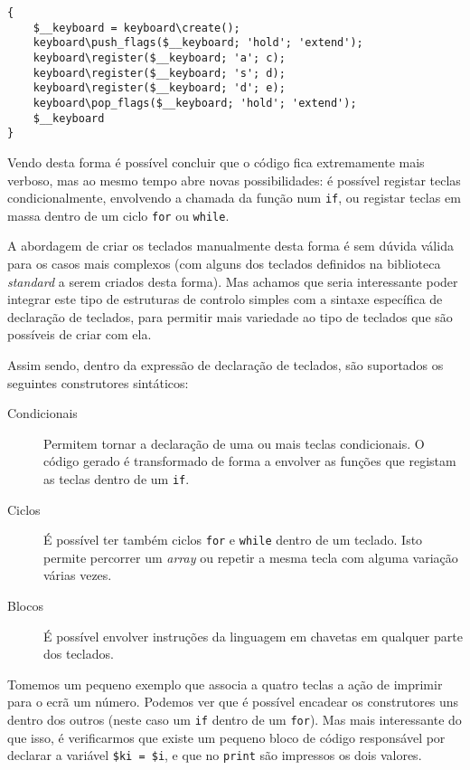 \begin{lstlisting}[caption={Código gerado automaticamente para criação do teclado descrito no capitulo anterior}]
{
    $__keyboard = keyboard\create();
    keyboard\push_flags($__keyboard; 'hold'; 'extend');
    keyboard\register($__keyboard; 'a'; c);
    keyboard\register($__keyboard; 's'; d);
    keyboard\register($__keyboard; 'd'; e);
    keyboard\pop_flags($__keyboard; 'hold'; 'extend');
    $__keyboard
}
\end{lstlisting}

Vendo desta forma é possível concluir que o código fica extremamente mais verboso, mas ao mesmo tempo abre novas possibilidades: é possível registar teclas condicionalmente, envolvendo a chamada da função num \texttt{if}, ou registar teclas em massa dentro de um ciclo \texttt{for} ou \texttt{while}.

A abordagem de criar os teclados manualmente desta forma é sem dúvida válida para os casos mais complexos (com alguns dos teclados definidos na biblioteca \textit{standard} a serem criados desta forma). Mas achamos que seria interessante poder integrar este tipo de estruturas de controlo simples com a sintaxe específica de declaração de teclados, para permitir mais variedade ao tipo de teclados que são possíveis de criar com ela.

Assim sendo, dentro da expressão de declaração de teclados, são suportados os seguintes construtores sintáticos:
\begin{description}
 \item[Condicionais] Permitem tornar a declaração de uma ou mais teclas condicionais. O código gerado é transformado de forma a envolver as funções que registam as teclas dentro de um \texttt{if}.
 \item[Ciclos] É possível ter também ciclos \texttt{for} e \texttt{while} dentro de um teclado. Isto permite percorrer um \textit{array} ou repetir a mesma tecla com alguma variação várias vezes.
 \item[Blocos] É possível envolver instruções da linguagem em chavetas em qualquer parte dos teclados.
\end{description}

Tomemos um pequeno exemplo que associa a quatro teclas a ação de imprimir para o ecrã um número. Podemos ver que é possível encadear os construtores uns dentro dos outros (neste caso um \texttt{if} dentro de um \texttt{for}). Mas mais interessante do que isso, é verificarmos que existe um pequeno bloco de código responsável por declarar a variável \texttt{\$ki = \$i}, e que no \texttt{print} são impressos os dois valores.

